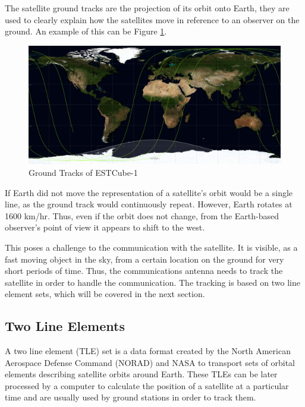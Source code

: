 The satellite ground tracks are the projection of its orbit onto Earth, they are used to clearly explain how the satellites move in reference to an observer on the ground. An example of this can be Figure \ref{f2.4}.

\begin{figure}[H]
\centerline{\includegraphics[width=1\textwidth]{images/GroundTracks.png}}
\caption{Ground Tracks of ESTCube-1}
\label{f2.4}
\end{figure}

If Earth did not move the representation of a satellite's orbit would be a single line, as the ground track would continuously repeat. However, Earth rotates at 1600 km/hr. Thus, even if the orbit does not change, from the Earth-based observer's point of view it appears to shift to the west.

This poses a challenge to the communication with the satellite. It is visible, as a fast moving object in the sky, from a certain location on the ground for very short periods of time. Thus, the communications antenna needs to track the satellite in order to handle the communication. The tracking is based on two line element sets, which will be covered in the next section.


\subsection{Two Line Elements}\label{2.4}
A two line element (TLE) set is a data format created by the North American Aerospace Defense Command (NORAD) and NASA to transport sets of orbital elements describing satellite orbits around Earth. These TLEs can be later processed by a computer to calculate the position of a satellite at a particular time and are usually used by ground stations in order to track them.

